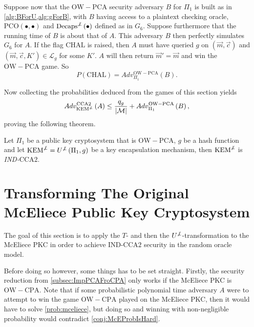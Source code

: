 Suppose now that the $\mathrm{OW-PCA}$ security adversary $B$ for $\Pi_1$ is built as in \cref{alg:BForU,alg:gForB}, with $B$ having access to a plaintext checking oracle, $\mathrm{PCO}\left(\bullet, \bullet\right)$ and $\mathrm{Decaps}^{\not\bot}\left(\bullet\right)$ defined as in $G_6$. Suppose furthermore that the running time of $B$ is about that of $A$. This adversary $B$ then perfectly simulates $G_6$ for $A$. If the flag $\mathrm{CHAL}$ is raised, then $A$ must have queried $g$ on $\left(\vec{m}, \vec{c}\right)$ and $\left(\vec{m}, \vec{c}, K'\right) \in \mathcal{L}_g$ for some $K'$. $A$ will then return $\vec{m}' = \vec{m}$ and win the $\mathrm{OW-PCA}$ game. So
\[
	P\left(\mathrm{CHAL}\right) = Adv_{\Pi_1}^{\mathrm{OW-PCA}}\left(B\right).
\]

Now collecting the probabilities deduced from the games of this section yields
\begin{equation}
\label{eq:boundFromthm34inHHK}
	Adv_{\mathrm{KEM}^{\not\bot}}^{\mathrm{CCA}2}\left(A\right) \leq \frac{q_g}{\left\vert \mathcal{M} \right\vert} + Adv_{\Pi_1}^{\mathrm{OW-PCA}}\left(B\right),
\end{equation}
proving the following theorem.
\begin{thm}
	Let $\Pi_1$ be a public key cryptosystem that is $\mathrm{OW-PCA}$, $g$ be a hash function and let $\mathrm{KEM}^{\not\bot} = U^{\not\bot}\left(\Pi_1, g\right)$ be a key encapsulation mechanism, then $\mathrm{KEM}^{\not\bot}$ is \emph{IND-}$\mathrm{CCA}2$.
\end{thm}



\section{Transforming The Original McEliece Public Key Cryptosystem}
\label{sec:traOrgMcEPKC}

The goal of this section is to apply the $T$- and then the $U^{\not\bot}$-transformation to the McEliece PKC in order to achieve IND-$\mathrm{CCA}2$ security in the random oracle model.

Before doing so however, some things has to be set straight. Firstly, the security reduction from \cref{subsec:ImpPCAFroCPA} only works if the McEliece PKC is $\mathrm{OW-CPA}$. Note that if some probabilistic polynomial time adversary $A$ were to attempt to win the game $\mathrm{OW-CPA}$ played on the McEliece PKC, then it would have to solve \cref{prob:mceliece}, but doing so and winning with non-negligible probability would contradict \cref{conj:McEProbIsHard}.

